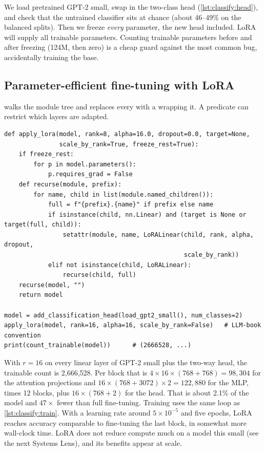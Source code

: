 We load pretrained GPT-2 small, swap in the two-class head
(\cref{lst:classify:head}), and check that the untrained classifier sits at chance
(about 46--49\% on the balanced splits). Then we freeze
\emph{every} parameter, the new head included. LoRA will supply all trainable
parameters. Counting trainable parameters before and after freezing (124M, then zero)
is a cheap guard against the most common bug, accidentally training the base.

\subsection{Parameter-efficient fine-tuning with LoRA}

 walks the module tree and replaces every  with a
 wrapping it. A predicate can restrict which layers are adapted.

\begin{lstlisting}[caption={Replacing linear layers with LoRA layers.},label={lst:instruct:applylora}]
def apply_lora(model, rank=8, alpha=16.0, dropout=0.0, target=None,
               scale_by_rank=True, freeze_rest=True):
    if freeze_rest:
        for p in model.parameters():
            p.requires_grad = False
    def recurse(module, prefix):
        for name, child in list(module.named_children()):
            full = f"{prefix}.{name}" if prefix else name
            if isinstance(child, nn.Linear) and (target is None or target(full, child)):
                setattr(module, name, LoRALinear(child, rank, alpha, dropout,
                                                 scale_by_rank))
            elif not isinstance(child, LoRALinear):
                recurse(child, full)
    recurse(model, "")
    return model

model = add_classification_head(load_gpt2_small(), num_classes=2)
apply_lora(model, rank=16, alpha=16, scale_by_rank=False)   # LLM-book convention
print(count_trainable(model))      # (2666528, ...)
\end{lstlisting}

With $r=16$ on every linear layer of GPT-2 small plus the two-way head, the trainable
count is 2{,}666{,}528. Per block that is $4\times16\times(768+768)=98{,}304$ for the
attention projections and $16\times(768+3072)\times2=122{,}880$ for the MLP, times 12
blocks, plus $16\times(768+2)$ for the head. That is about 2.1\% of the model and
$47\times$ fewer than full fine-tuning. Training uses the same loop as
\cref{lst:classify:train}. With a learning rate around $5\times10^{-5}$ and five epochs,
LoRA reaches accuracy comparable to fine-tuning the last block, in somewhat more
wall-clock time. LoRA does not reduce compute much on a model this small (see the
next Systems Lens), and its benefits appear at scale.

